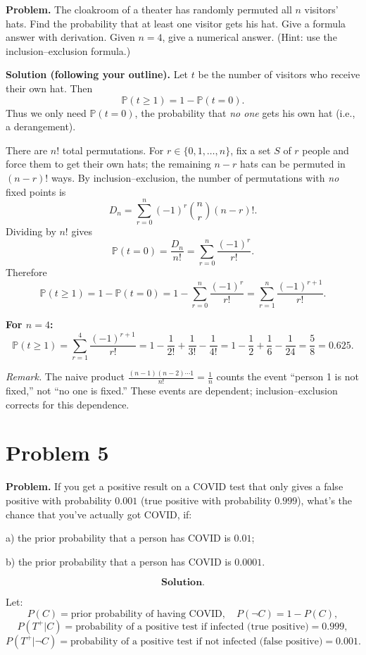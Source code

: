 \documentclass{article}
\begin{document}
\textbf{Problem.} The cloakroom of a theater has randomly permuted all \( n \) visitors’ hats. Find the probability that at least one visitor gets his hat. Give a formula answer with derivation. Given \( n = 4 \), give a numerical answer. (Hint: use the inclusion–exclusion formula.)

\textbf{Solution (following your outline).}
Let $t$ be the number of visitors who receive their own hat. Then
\[
\mathbb{P}(t\ge 1)=1-\mathbb{P}(t=0).
\]
Thus we only need $\mathbb{P}(t=0)$, the probability that \emph{no one} gets his own hat
(i.e., a derangement).

There are $n!$ total permutations. For $r\in\{0,1,\dots,n\}$, fix a set $S$ of $r$
people and force them to get their own hats; the remaining $n-r$ hats can be
permuted in $(n-r)!$ ways. By inclusion–exclusion, the number of permutations
with \emph{no} fixed points is
\[
D_n
= \sum_{r=0}^n (-1)^r \binom{n}{r} (n-r)!.
\]
Dividing by $n!$ gives
\[
\mathbb{P}(t=0)=\frac{D_n}{n!}
=\sum_{r=0}^n \frac{(-1)^r}{r!}.
\]
Therefore
\[
\mathbb{P}(t\ge 1)=1-\mathbb{P}(t=0)
=1-\sum_{r=0}^n \frac{(-1)^r}{r!}
=\sum_{r=1}^n \frac{(-1)^{r+1}}{r!}.
\]

\textbf{For $n=4$:}
\[
\mathbb{P}(t\ge 1)=\sum_{r=1}^4 \frac{(-1)^{r+1}}{r!}
=1-\frac{1}{2!}+\frac{1}{3!}-\frac{1}{4!}
=1-\frac12+\frac16-\frac{1}{24}
=\frac{5}{8}=0.625.
\]

\textit{Remark.} The naive product
$\frac{(n-1)(n-2)\cdots 1}{n!}=\frac{1}{n}$ counts the event
“person 1 is not fixed,” not “no one is fixed.” These events are dependent;
inclusion–exclusion corrects for this dependence.

\section{Problem 5}

\textbf{Problem.} If you get a positive result on a COVID test that only gives a false positive with probability \( 0.001 \) (true positive with probability \( 0.999 \)), what’s the chance that you’ve actually got COVID, if:

a) the prior probability that a person has COVID is \( 0.01 \);

b) the prior probability that a person has COVID is \( 0.0001 \).

\[
\textbf{Solution.}
\]

Let:
\[
P(C) = \text{prior probability of having COVID}, \quad
P(\neg C) = 1 - P(C),
\]
\[
P(T^+|C) = \text{probability of a positive test if infected (true positive)} = 0.999,
\]
\[
P(T^+|\neg C) = \text{probability of a positive test if not infected (false positive)} = 0.001.
\]
\end{document}
